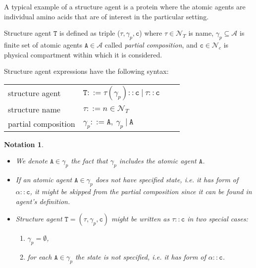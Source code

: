 \documentclass{entcs}
\renewcommand{\~}[0]{\texttildelow}
\newcommand{\choice}{|}
\newtheorem{notation}[thm]{Notation}
\begin{document}
A typical example of a structure agent is a protein where the atomic agents are individual amino acids that are of interest in the particular setting.

\begin{definition}
Structure agent $\mathtt{T}$ is defined as triple ($\tau, \gamma_p, \mathtt{c}$) where $\tau \in \mathcal{N}_{T}$ is name, $\gamma_p \subseteq \mathcal{A}$ is finite set of atomic agents $\mathtt{A} \in \mathcal{A}$ called \emph{partial composition}, and $\mathtt{c} \in \mathcal{N}_{c}$ is physical compartment within which it is considered.
\end{definition}

Structure agent expressions have the following syntax:

\begin{center}
{\small
\hspace*{-1cm}\begin{tabular}{ ll ll }
 structure agent & $\mathtt{T} ::= \tau(\gamma_p)::\mathtt{c}~\choice~\tau::\mathtt{c}$\\
 structure name & $\tau ::= n \in \mathcal{N}_{T}$\\
 partial composition & $\gamma_p ::= \mathtt{A},~\gamma_p~\choice~\mathtt{A}$\\
\end{tabular}
}
\end{center}   

\begin{notation}
~
\begin{itemize}
\item We denote $\mathtt{A}\in\gamma_p$ the fact that $\gamma_p$ includes the atomic agent $\mathtt{A}$.
\item If an atomic agent $\mathtt{A} \in \gamma_p$ does not have specified state, i.e. it has form of $\alpha::\mathtt{c}$, it might be skipped from the partial composition since it can be found in agent's definition.
\item Structure agent $\mathtt{T} = (\tau, \gamma_p, \mathtt{c})$ might be written as $\tau::\mathtt{c}$ in two special cases:
	\begin{enumerate}
		\item $\gamma_p = \emptyset$,
		\item for each $\mathtt{A} \in \gamma_p$ the state is not specified, i.e. it has form of $\alpha::\mathtt{c}$.
	\end{enumerate}
\end{itemize}
\end{notation}
\end{document}
